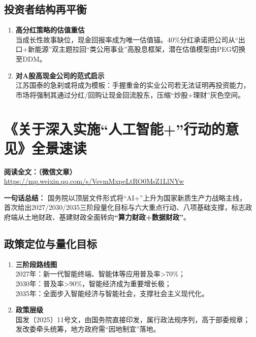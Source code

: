 \subsection{投资者结构再平衡}
\begin{enumerate}[leftmargin=*, nosep]
    \item \textbf{高分红策略的估值重估}  \\
    当成长性故事缺位，现金回报率成为唯一估值锚。40\%分红承诺把公司从“出口+新能源”双主题拉回“类公用事业”高股息框架，潜在估值模型由PEG切换至DDM。  
    \item \textbf{对A股高现金公司的范式启示}  \\
    江苏国泰的急刹或将成为模板：{\color{red}手握重金的实业公司若无法证明再投资能力，市场将强制其通过分红/回购让现金回流股东，压缩“炒股+理财”灰色空间。}
\end{enumerate}

\clearpage

\section{《关于深入实施“人工智能+”行动的意见》全景速读}
\vspace{1cm}
\noindent\textbf{阅读全文：（微信文章）} \url{https://mp.weixin.qq.com/s/VsvmMxpeLtRO0MsZ1LlNYw}

\textbf{一句话总结：}  
国务院以顶层文件形式将“AI+”上升为国家新质生产力战略主线，首次给出2027/2030/2035三阶段量化目标与六大重点行动、八项基础支撑，标志政府端从土地财政、基建财政全面转向{\color{red}\textbf{“算力财政+数据财政”}}。

\subsection{政策定位与量化目标}
\begin{enumerate}[leftmargin=*, nosep]
    \item \textbf{三阶段路线图}  \\
    2027年：新一代智能终端、智能体等应用普及率>70\%；  \\
    2030年：普及率>90\%，智能经济成为重要增长极；  \\
    2035年：全面步入智能经济与智能社会，支撑社会主义现代化。
    \item \textbf{政策层级}  \\
    国发〔2025〕11号文，由国务院直接印发，属行政法规序列，高于部委规章；发改委牵头统筹，地方政府需“因地制宜”落地。
\end{enumerate}

